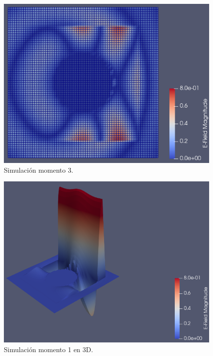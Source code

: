 \documentclass[
    11pt,
    spanish,
    a4paper
]{article}
\begin{document}
\begin{figure}[htbp]
	\centering
	\includegraphics[width=\textwidth]{./img/salida.png}
	\caption{Simulación momento 3.}
	\label{fig:sim6}
\end{figure}

\begin{figure}[htbp]
	\centering
	\includegraphics[width=\textwidth]{./img/impacto3d.png}
	\caption{Simulación momento 1 en 3D.}
	\label{fig:sim7}
\end{figure}
\end{document}
